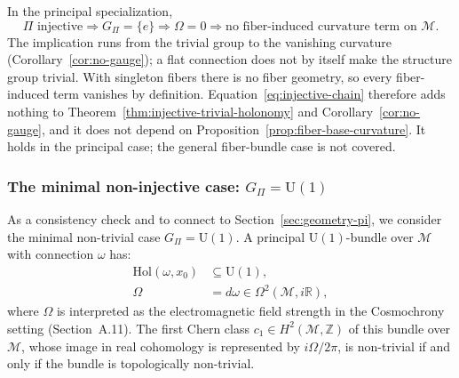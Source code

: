     \begin{remark}
      In the principal specialization,
      \begin{equation}
        \Pi \text{ injective}
        \Rightarrow
        G_\Pi = \{e\}
        \Rightarrow
        \Omega = 0
        \Rightarrow
        \text{no fiber-induced curvature term on } \mathcal{M}.
        \label{eq:injective-chain}
      \end{equation}
      The implication runs from the trivial group to the vanishing curvature (Corollary~\ref{cor:no-gauge}); a flat
      connection does not by itself make the structure group trivial.
      With singleton fibers there is no fiber geometry, so every fiber-induced term vanishes by definition.
      Equation~\eqref{eq:injective-chain} therefore adds nothing to Theorem~\ref{thm:injective-trivial-holonomy}
      and Corollary~\ref{cor:no-gauge}, and it does not depend on Proposition~\ref{prop:fiber-base-curvature}.
      It holds in the principal case; the general fiber-bundle case is not covered.
    \end{remark}

  \subsubsection*{The minimal non-injective case: $G_\Pi = \mathrm{U}(1)$}
    \label{subsec:stepA-minimal}

    As a consistency check and to connect to Section~\ref{sec:geometry-pi},
    we consider the minimal non-trivial case $G_\Pi = \mathrm{U}(1)$.
    A principal $\mathrm{U}(1)$-bundle over $\mathcal{M}$ with connection $\omega$ has:
    \begin{align}
      \mathrm{Hol}(\omega, x_0) &\subseteq \mathrm{U}(1), \\
      \Omega &= d\omega \in \Omega^2(\mathcal{M}, i\mathbb{R}),
    \end{align}
    where $\Omega$ is interpreted as the electromagnetic field strength in the Cosmochrony setting (Section~A.11).
    The first Chern class $c_1 \in H^2(\mathcal{M}, \mathbb{Z})$ of this bundle over $\mathcal{M}$, whose image in
    real cohomology is represented by $i\Omega/2\pi$, is non-trivial if and only if the bundle is topologically
    non-trivial.

